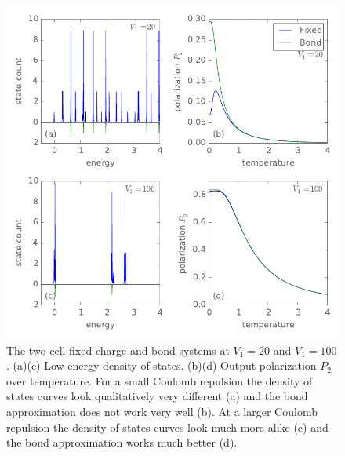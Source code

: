 \begin{figure}
  \center
  \includegraphics{bond_approximation2}
  \caption{
  The two-cell fixed charge and bond systems at $V_1 = 20$ and $V_1 = 100$.
  (a)(c) Low-energy density of states. (b)(d) Output polarization $P_2$ over
  temperature. For a small Coulomb repulsion the density of states curves look
  qualitatively very different (a) and the bond approximation does not work very
  well (b). At a larger Coulomb repulsion the density of states curves look much
  more alike (c) and the bond approximation works much better (d).
  }
  \label{fig:bond_approximation2}
\end{figure}
%

